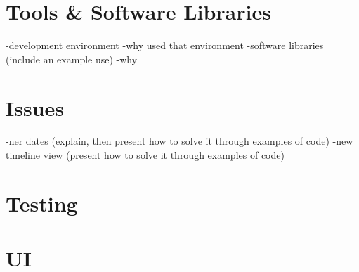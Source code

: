 \section{Tools & Software Libraries}
-development environment
-why used that environment
-software libraries (include an example use)
-why
\section{Issues}
-ner dates (explain, then present how to solve it through examples of code)
-new timeline view (present how to solve it through examples of code)
\section{Testing}
\section{UI}
